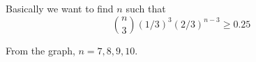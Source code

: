 
Basically we want to find $n$ such that 
\[
\binom{n}{3}(1/3)^3(2/3)^{n-3}  \geq 0.25
\]



From the graph, $n = 7, 8, 9, 10$.
